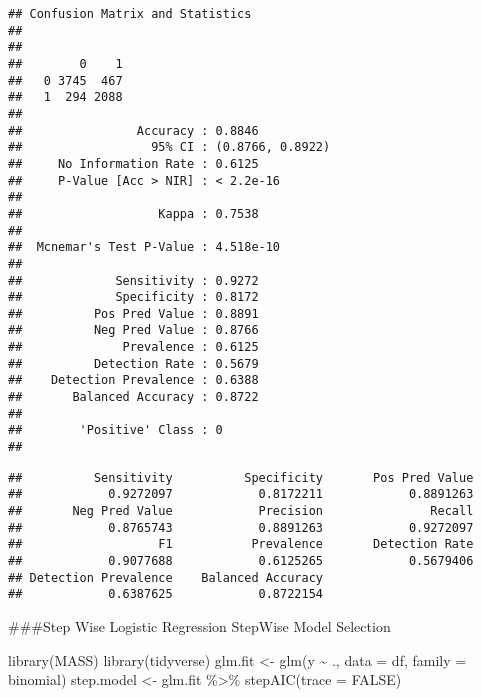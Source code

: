 \documentclass[
]{article}
\newenvironment{Shaded}{\begin{snugshade}}{\end{snugshade}}
\newcommand{\AttributeTok}[1]{\textcolor[rgb]{0.77,0.63,0.00}{#1}}
\newcommand{\ConstantTok}[1]{\textcolor[rgb]{0.00,0.00,0.00}{#1}}
\newcommand{\FunctionTok}[1]{\textcolor[rgb]{0.00,0.00,0.00}{#1}}
\newcommand{\NormalTok}[1]{#1}
\newcommand{\OtherTok}[1]{\textcolor[rgb]{0.56,0.35,0.01}{#1}}
\newcommand{\SpecialCharTok}[1]{\textcolor[rgb]{0.00,0.00,0.00}{#1}}
\begin{document}
\begin{verbatim}
## Confusion Matrix and Statistics
## 
##    
##        0    1
##   0 3745  467
##   1  294 2088
##                                           
##                Accuracy : 0.8846          
##                  95% CI : (0.8766, 0.8922)
##     No Information Rate : 0.6125          
##     P-Value [Acc > NIR] : < 2.2e-16       
##                                           
##                   Kappa : 0.7538          
##                                           
##  Mcnemar's Test P-Value : 4.518e-10       
##                                           
##             Sensitivity : 0.9272          
##             Specificity : 0.8172          
##          Pos Pred Value : 0.8891          
##          Neg Pred Value : 0.8766          
##              Prevalence : 0.6125          
##          Detection Rate : 0.5679          
##    Detection Prevalence : 0.6388          
##       Balanced Accuracy : 0.8722          
##                                           
##        'Positive' Class : 0               
## 
\end{verbatim}

\begin{Shaded}
\end{Shaded}

\begin{verbatim}
##          Sensitivity          Specificity       Pos Pred Value 
##            0.9272097            0.8172211            0.8891263 
##       Neg Pred Value            Precision               Recall 
##            0.8765743            0.8891263            0.9272097 
##                   F1           Prevalence       Detection Rate 
##            0.9077688            0.6125265            0.5679406 
## Detection Prevalence    Balanced Accuracy 
##            0.6387625            0.8722154
\end{verbatim}

\#\#\#Step Wise Logistic Regression StepWise Model Selection

\begin{Shaded}
\begin{Highlighting}[]
\FunctionTok{library}\NormalTok{(MASS)}
\FunctionTok{library}\NormalTok{(tidyverse)}
\NormalTok{glm.fit }\OtherTok{\textless{}{-}} \FunctionTok{glm}\NormalTok{(y }\SpecialCharTok{\textasciitilde{}}\NormalTok{ ., }\AttributeTok{data =}\NormalTok{ df, }\AttributeTok{family =}\NormalTok{ binomial)}
\NormalTok{step.model }\OtherTok{\textless{}{-}}\NormalTok{ glm.fit }\SpecialCharTok{\%\textgreater{}\%} \FunctionTok{stepAIC}\NormalTok{(}\AttributeTok{trace =} \ConstantTok{FALSE}\NormalTok{)}
\end{Highlighting}
\end{Shaded}
\end{document}
